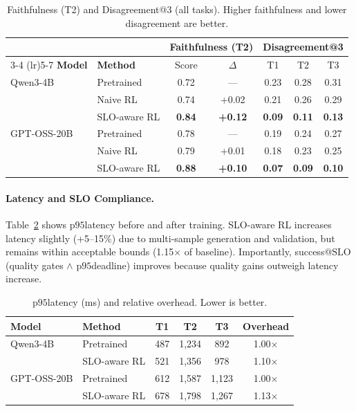 \documentclass[11pt]{article}
\newcommand{\pninetyfive}{\ensuremath{\mathrm{p95}}}
\newcommand{\slo}{\ensuremath{\mathrm{SLO}}}
\begin{document}
\begin{table}[t]
\centering
\caption{Faithfulness (T2) and Disagreement@3 (all tasks). Higher faithfulness and lower disagreement are better.}
\label{tab:faithfulness-stability}
\begin{tabular}{l l cc ccc}
\toprule
& & \multicolumn{2}{c}{\textbf{Faithfulness (T2)}} & \multicolumn{3}{c}{\textbf{Disagreement@3}} \\
\cmidrule(lr){3-4} \cmidrule(lr){5-7}
\textbf{Model} & \textbf{Method} & Score & $\Delta$ & T1 & T2 & T3 \\
\midrule
Qwen3-4B & Pretrained & 0.72 & --- & 0.23 & 0.28 & 0.31 \\
& Naive RL & 0.74 & +0.02 & 0.21 & 0.26 & 0.29 \\
& SLO-aware RL & \textbf{0.84} & \textbf{+0.12} & \textbf{0.09} & \textbf{0.11} & \textbf{0.13} \\
\midrule
GPT-OSS-20B & Pretrained & 0.78 & --- & 0.19 & 0.24 & 0.27 \\
& Naive RL & 0.79 & +0.01 & 0.18 & 0.23 & 0.25 \\
& SLO-aware RL & \textbf{0.88} & \textbf{+0.10} & \textbf{0.07} & \textbf{0.09} & \textbf{0.10} \\
\bottomrule
\end{tabular}
\end{table}

\paragraph{Latency and SLO Compliance.}
Table~\ref{tab:latency} shows \pninetyfive latency before and after training.
SLO-aware RL increases latency slightly (+5--15\%) due to multi-sample generation and validation, but remains within acceptable bounds (1.15$\times$ of baseline).
Importantly, success@\slo (quality gates $\wedge$ \pninetyfive deadline) improves because quality gains outweigh latency increase.

\begin{table}[t]
\centering
\caption{\pninetyfive latency (ms) and relative overhead. Lower is better.}
\label{tab:latency}
\begin{tabular}{l l ccc c}
\toprule
\textbf{Model} & \textbf{Method} & \textbf{T1} & \textbf{T2} & \textbf{T3} & \textbf{Overhead} \\
\midrule
Qwen3-4B & Pretrained & 487 & 1{,}234 & 892 & 1.00$\times$ \\
& SLO-aware RL & 521 & 1{,}356 & 978 & 1.10$\times$ \\
\midrule
GPT-OSS-20B & Pretrained & 612 & 1{,}587 & 1{,}123 & 1.00$\times$ \\
& SLO-aware RL & 678 & 1{,}798 & 1{,}267 & 1.13$\times$ \\
\bottomrule
\end{tabular}
\end{table}
\end{document}
